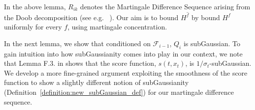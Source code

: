 
In the above lemma, $R_{ik}$ denotes the Martingale Difference Sequence arising from the Doob decomposition (see e.g. ~\cite{durrett2019probability}). Our aim is to bound $H^{\hat{f}}$ by bound $H^{f}$ uniformly for every $f$, using martingale concentration.

In the next lemma, we show that conditioned on $\mathcal{F}_{i-1}$, $Q_{i}$ is subGaussian.
To gain intuition into how subGaussianity comes into play in our context, we note that Lemma F.3. in \cite{gupta2023sample} shows that the score function, $s(t, x_t)$, is $1/\sigma_{t}$-subGaussian. We develop a more fine-grained argument exploiting the smoothness of the score function to show a slightly different notion of subGaussianity (Definition~\ref{definition:new_subGaussian_def}) for our martingale difference sequence. 

